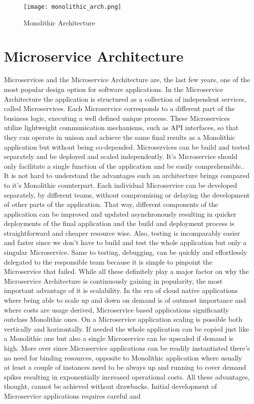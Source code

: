 \begin{figure}[!h]
    \graphicspath{ {./diagrams/} }
    \texttt{[image: monolithic\_arch.png]}
    \centering
    \caption{Monolithic Architecture}
    \label{fig:mono_arch}
\end{figure}

\section{Microservice Architecture}

Microservices and the Microservice Architecture are, the last few years, one of the most popular design option for software applications. In the Microservice Architecture the application is structured as a collection of independent services, called Microservices. Each Microservice corresponds to a different part of the business logic, executing a well defined unique process\cite{monovsmicro}\cite{microservicesdef}. These Microservices utilize lightweight communication mechanisms, such as API interfaces, so that they can operate in unison and achieve the same final results as a Monolithic application but without being co-depended. Microservices can be build and tested separately and be deployed and scaled independently. It's Microservice should only facilitate a single function of the application and be easily comprehensible.\cite{chandrinos_thesis}. It is not hard to understand the advantages such an architecture brings compared to it's Monolithic counterpart. Each individual Microservice can be developed separately, by different teams, without compromising or delaying the development of other parts of the application. That way, different components of the application can be improved and updated asynchronously resulting in quicker deployments of the final application and the build and deployment process is straightforward and cheaper resource wise. Also, testing is incomparably easier and faster since we don't have to build and test the whole application but only a singular Microservice. Same to testing, debugging, can be quickly and effortlessly delegated to the responsible team because it is simple to pinpoint the Microservice that failed. While all these definitely play a major factor on why the Microservice Architecture is continuously gaining in popularity, the most important advantage of it is scalability. In the era of cloud native applications where being able to scale up and down on demand is of outmost importance and where costs are usage derived, Microservice based applications significantly outclass Monolithic ones. On a Microservice application scaling is possible both vertically and horizontally. If needed the whole application can be copied just like a Monolithic one but also a single Microservice can be upscaled if demand is high. More over since Microservice applications can be readily instantiated there's no need for binding resources, opposite to Monolithic application where usually at least a couple of instances need to be always up and running to cover demand spikes resulting in exponentially increased operational costs. All these advantages, thought, cannot be achieved without drawbacks. Initial development of Microservice applications requires careful and 